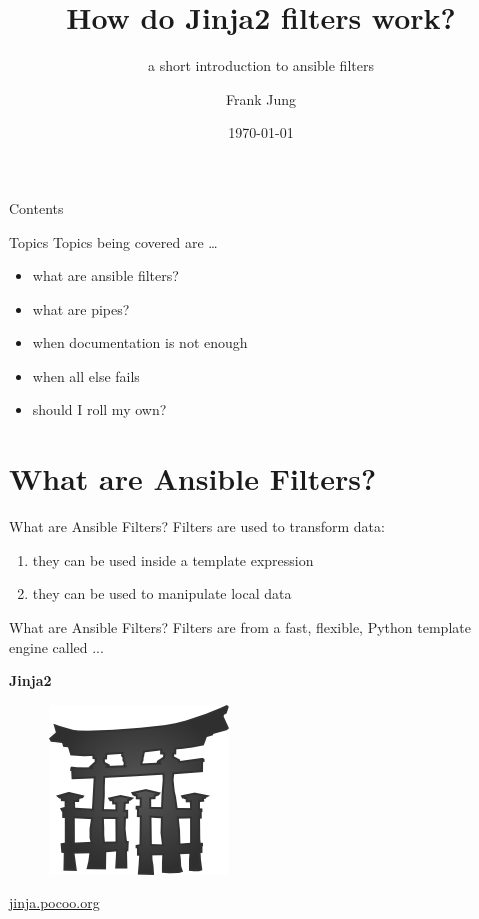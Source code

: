\documentclass[pdf]{beamer}
\title{How do Jinja2 filters work?}
\subtitle{a short introduction to ansible filters}
\author{Frank Jung}
\institute{frankhjung@linux.com}
\date{\today}
\begin{document}
\begin{frame}
  \titlepage{}
\end{frame}

\begin{frame}{Contents}
  \tableofcontents{}
\end{frame}

\begin{frame}{Topics}
  Topics being covered are \ldots
  \pause{}
  \begin{itemize}
    \item{} what are ansible filters?
      \pause{}
    \item{} what are pipes?
      \pause{}
    \item{} when documentation is not enough
      \pause{}
    \item{} when all else fails
      \pause{}
    \item{} should I roll my own?
  \end{itemize}
\end{frame}

\section{What are Ansible Filters?}
\begin{frame}{What are Ansible Filters?}
  Filters are used to transform data:
  \pause{}
  \begin{enumerate}
    \item{} they can be used inside a template expression
    \pause{}
    \item{} they can be used to manipulate local data
  \end{enumerate}
\end{frame}

\begin{frame}{What are Ansible Filters?}
  Filters are from a fast, flexible, Python template engine called ...
  \pause{}
  \begin{center}
    \textbf{Jinja2} \\
    \begin{figure}
      \includegraphics{jinja-logo.png}
    \end{figure}
    \href{http://jinja.pocoo.org}{jinja.pocoo.org}
  \end{center}
\end{frame}
\end{document}
